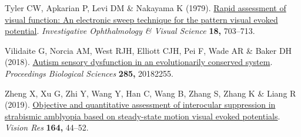 \documentclass[
  letterpaper,
  DIV=11,
  numbers=noendperiod]{scrartcl}
\newlength{\cslhangindent}
\newenvironment{CSLReferences}[2] %
 {\begin{list}{}{%
  \setlength{\itemindent}{0pt}
  \setlength{\leftmargin}{0pt}
  \setlength{\parsep}{0pt}
  \ifodd #1
   \setlength{\leftmargin}{\cslhangindent}
   \setlength{\itemindent}{-1\cslhangindent}
  \fi
  \setlength{\itemsep}{#2\baselineskip}}}
 {\end{list}}
\begin{document}
\begin{CSLReferences}{1}{1}
Tyler CW, Apkarian P, Levi DM \& Nakayama K (1979).
\href{https://www.ncbi.nlm.nih.gov/pubmed/447469}{Rapid assessment of
visual function: An electronic sweep technique for the pattern visual
evoked potential}. \emph{Investigative Ophthalmology \& Visual Science}
\textbf{18,} 703--713.

Vilidaite G, Norcia AM, West RJH, Elliott CJH, Pei F, Wade AR \& Baker
DH (2018). \href{https://doi.org/10.1098/rspb.2018.2255}{Autism sensory
dysfunction in an evolutionarily conserved system}. \emph{Proceedings
Biological Sciences} \textbf{285,} 20182255.

Zheng X, Xu G, Zhi Y, Wang Y, Han C, Wang B, Zhang S, Zhang K \& Liang R
(2019). \href{https://doi.org/10.1016/j.visres.2019.07.003}{Objective
and quantitative assessment of interocular suppression in strabismic
amblyopia based on steady-state motion visual evoked potentials}.
\emph{Vision Res} \textbf{164,} 44--52.

\end{CSLReferences}
\end{document}
